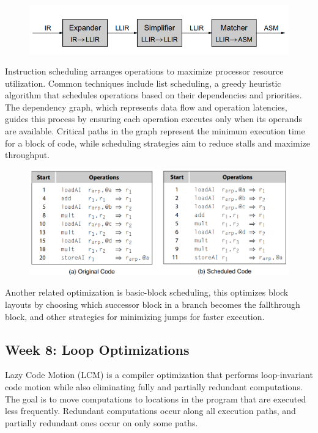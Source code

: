 \documentclass[11pt, a4paper, titlepage]{article}
\begin{document}
\begin{figure}[H]
  \centering
  \includegraphics[scale=0.4]{images/r12.png}
\end{figure}

Instruction scheduling arranges operations to maximize processor resource utilization. Common techniques include list scheduling, a greedy heuristic algorithm that schedules operations based on their dependencies and priorities. The dependency graph, which represents data flow and operation latencies, guides this process by ensuring each operation executes only when its operands are available. Critical paths in the graph represent the minimum execution time for a block of code, while scheduling strategies aim to reduce stalls and maximize throughput.

\begin{figure}[H]
  \centering
  \includegraphics[scale=0.4]{images/r13.png}
\end{figure}

Another related optimization is basic-block scheduling, this optimizes block layouts by choosing which successor block in a branch becomes the fallthrough block, and other strategies for minimizing jumps for faster execution.

\subsection{Week 8: Loop Optimizations}

Lazy Code Motion (LCM) is a compiler optimization that performs loop-invariant code motion while also eliminating fully and partially redundant computations. The goal is to move computations to locations in the program that are executed less frequently. Redundant computations occur along all execution paths, and partially redundant ones occur on only some paths.
\end{document}
